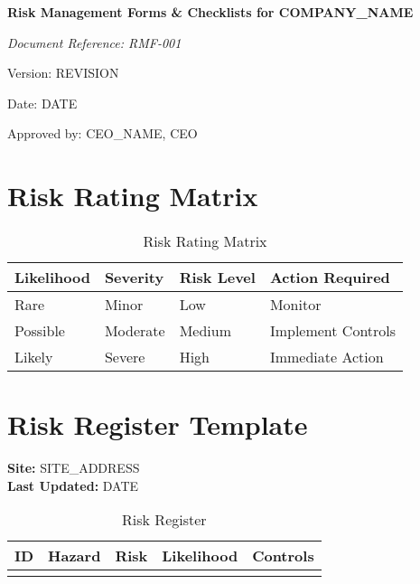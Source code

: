 \documentclass[12pt]{article}
\begin{document}
\begin{titlepage}
    \centering
    \vspace*{2cm}
    {\LARGE\bfseries Risk Management Forms \& Checklists for {{COMPANY_NAME}}\par}
    \vspace{1cm}
    {\large\itshape Document Reference: RMF-001\par}
    \vspace{0.5cm}
    {\normalsize Version: {{REVISION}}\par}
    \vspace{0.5cm}
    {\normalsize Date: {{DATE}}\par}
    \vspace{2cm}
    {\normalsize Approved by: {{CEO_NAME}}, CEO\par}
\end{titlepage}

\section{Risk Rating Matrix}

\begin{table}[h]
    \centering
    \begin{tabular}{p{3cm}p{3cm}p{3cm}p{3cm}}
        \toprule
        \textbf{Likelihood} & \textbf{Severity} & \textbf{Risk Level} & \textbf{Action Required} \\
        \midrule
        Rare & Minor & Low & Monitor \\
        Possible & Moderate & Medium & Implement Controls \\
        Likely & Severe & High & Immediate Action \\
        \bottomrule
    \end{tabular}
    \caption{Risk Rating Matrix}
\end{table}

\section{Risk Register Template}

\textbf{Site:} {{SITE_ADDRESS}}\\
\textbf{Last Updated:} {{DATE}}

\begin{table}[h]
    \centering
    \begin{tabular}{p{2cm}p{3cm}p{3cm}p{3cm}p{3cm}}
        \toprule
        \textbf{ID} & \textbf{Hazard} & \textbf{Risk} & \textbf{Likelihood} & \textbf{Controls} \\
        \midrule
        & & & & \\
        \bottomrule
    \end{tabular}
    \caption{Risk Register}
\end{table}
\end{document}
